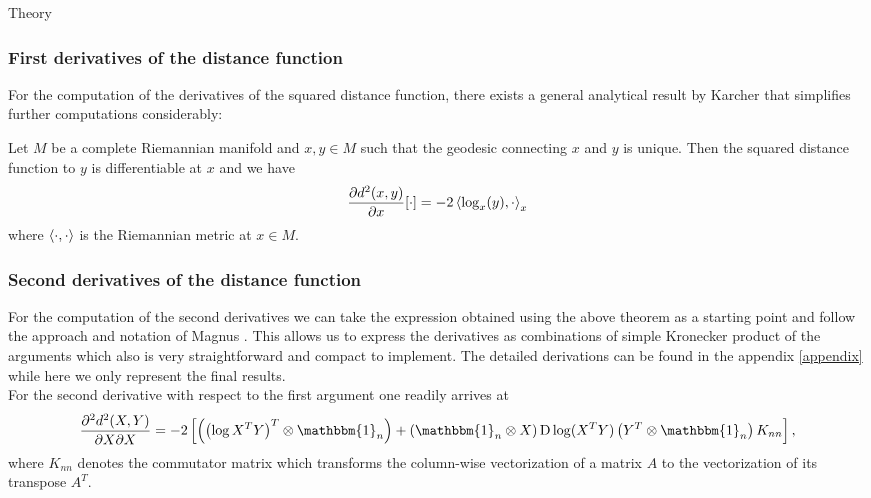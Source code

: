 \begin{chapter}{Theory}
\subsubsection{First derivatives of the distance function} %
\label{ssub:First derivatives of the distance function}
For the computation of the derivatives of the squared distance function, there exists a general analytical result by Karcher\cite{Karcher} that simplifies further
computations considerably:
\begin{theorem}[Karcher]
\label{thm:karcher_theorem}
Let $M$ be a complete Riemannian manifold and $x,y\in M$ such that the geodesic connecting $x$ and $y$ is unique. Then the squared distance function to $y$
is differentiable at $x$ and we have
\begin{equation}
    \frac{\partial d^2(x,y)}{\partial x}[\cdot] = -2\left\langle \log_x(y),\cdot \right\rangle_{x}
\end{equation}
where $\left\langle \cdot,\cdot \right\rangle$ is the Riemannian metric at $x\in M$.
\end{theorem}




\subsubsection{Second derivatives of the distance function} %
\label{ssub:Second derivatives of the distance function}
For the computation of the second derivatives we can take the expression obtained using the above theorem as a starting point and follow the approach and notation of Magnus \cite{Magnus}. 
This allows us to express the derivatives as combinations of simple Kronecker product of the arguments which also is very straightforward and compact to implement. 
The detailed derivations can be found in the appendix \ref{appendix} while here we only represent the final results. \\
For the second derivative with respect to the first argument one readily arrives at
\begin{equation}
    \label{eq:son_xx_der}
    \frac{\partial^2 d^2(X,Y)}{\partial X\partial X} = -2\left[\left(\left(\log X^TY\right)^T\otimes\mathbbm{1}_n\right) + \left(\mathbbm{1}_n\otimes X \right)\operatorname{D}\log(X^TY) \left(Y^T\otimes\mathbbm{1}_n \right) K_{nn}\right],
\end{equation}
where $K_{nn}$ denotes the commutator matrix which transforms the column-wise vectorization of a matrix $A$ to the vectorization of its transpose $A^T$.\\


\end{chapter}
